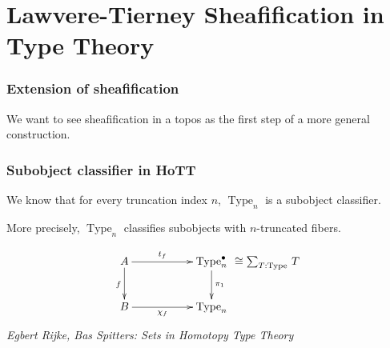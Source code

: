 \documentclass{beamer}
\DeclareMathOperator{\Type}{Type}
\newcommand{\sumD}[3]{\sum_{#1:#2}\, #3}
\begin{document}
\section[Sheafification]{Lawvere-Tierney Sheafification in Type Theory}
\label{sec:sheaf-type-theory}

\begin{frame}
  \frametitle{Extension of sheafification}
  We want to see sheafification in a topos as the first step of a more
  general construction.
\end{frame}

\begin{frame}
  \frametitle{Subobject classifier in HoTT}

  We know that for every truncation index $n$, $\Type_n$ is a
  subobject classifier. 

  More precisely, $\Type_n$ classifies subobjects with $n$-truncated
  fibers.
  
\[
\xymatrix{
  A \ar[rr]^{\hspace{-1em} t_f} \ar[d]_f && \Type_n^\bullet \ar[d]^{\pi_1} &\!\!\!\!\!\!\!\!\!\!\!\!\!\!\cong \sumD
  T \Type T \\
  B \ar[rr]_{\hspace{-1em} \chi_f} && \Type_n &
}
\]
\vfill
\small{{\em Egbert Rijke, Bas Spitters: Sets in Homotopy Type Theory}}
\end{frame}
\end{document}
